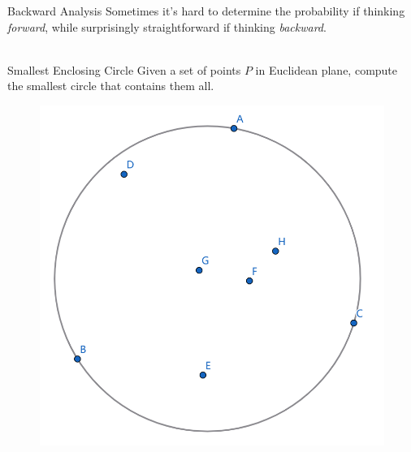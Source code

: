 \documentclass{beamer}
\newcommand{\lf}{\left[}
\newcommand{\rf}{\right]}
\begin{document}
\begin{frame}{Backward Analysis}
	Sometimes it's hard to determine the probability if thinking \textit{forward}, while surprisingly straightforward if thinking \textit{backward}. \\~\

	\begin{block}{Smallest Enclosing Circle}
		Given a set of points $P$ in Euclidean plane, compute the smallest circle that contains them all.
	\end{block}

	\begin{figure}[r]
		\includegraphics[width=0.4\linewidth]{pics/smallest_enclosing_circle_illustration.png}
	\end{figure}







\end{frame}
\end{document}

